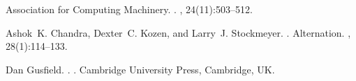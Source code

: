\documentclass[11pt]{article}
\begin{document}
\begin{CJK*}{UTF8}{gbsn}
\begin{thebibliography}{}
{Association for Computing Machinery}.
.
, 24(11):503--512.

Ashok~K. Chandra, Dexter~C. Kozen, and Larry~J. Stockmeyer.
.
\newblock Alternation.
,
  28(1):114--133.

Dan Gusfield.
.
.
\newblock Cambridge University Press, Cambridge, UK.

\end{thebibliography}

\end{CJK*}
\end{document}
